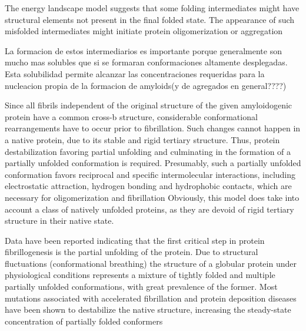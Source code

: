 The energy landscape model suggests that some folding intermediates might have structural elements not present in the final folded state.
The appearance of such misfolded intermediates might initiate protein oligomerization or aggregation

La formacion de estos intermediarios es importante porque generalmente son mucho mas solubles que si se formaran conformaciones altamente desplegadas. 
Esta solubilidad permite alcanzar las concentraciones requeridas para la nucleacion propia de la formacion de amyloids(y de agregados en general????)















Since all fibrils independent of the original structure of the given amyloidogenic protein have a common cross-b structure, considerable conformational rearrangements have to occur prior to fibrillation. 
Such changes cannot happen in a native protein, due to its stable and rigid tertiary structure. Thus, protein destabilization favoring partial unfolding and culminating in the formation of a partially unfolded conformation is required. 
Presumably, such a partially unfolded conformation favors reciprocal and specific intermolecular interactions, including electrostatic attraction, hydrogen bonding and hydrophobic contacts, which are necessary for oligomerization and fibrillation
Obviously, this model does take into account a class of natively unfolded proteins, as they are devoid of rigid tertiary structure in their native state.

Data have been reported indicating that the first critical step in protein fibrillogenesis is the partial unfolding of the protein. 
Due to structural fluctuations (conformational breathing) the structure of a globular protein under physiological conditions represents a mixture of tightly folded and multiple partially unfolded conformations, 
with great prevalence of the former. 
Most mutations associated with accelerated fibrillation and protein deposition diseases have been shown to destabilize the native structure, increasing the steady-state concentration of partially folded conformers

